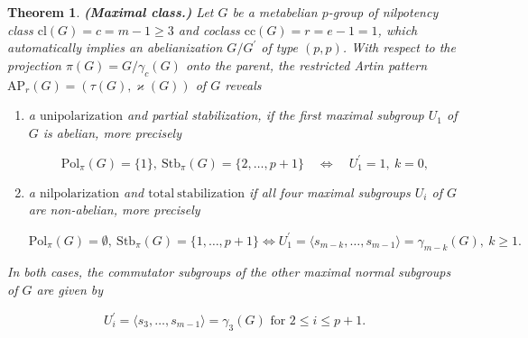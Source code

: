 \documentclass{amsart}
\newtheorem{theorem}{Theorem}[section]
\theoremstyle{definition}
\numberwithin{equation}{section}
\begin{document}
\begin{theorem}
\label{thm:MaxClass}
\textbf{(Maximal class.)}
Let \(G\) be a metabelian \(p\)-group
of nilpotency class \(\mathrm{cl}(G)=c=m-1\ge 3\) and coclass \(\mathrm{cc}(G)=r=e-1=1\),
which automatically implies an abelianization \(G/G^\prime\) of type \((p,p)\).
With respect to the projection \(\pi(G)=G/\gamma_c(G)\) onto the parent,
the restricted Artin pattern \(\mathrm{AP}_r(G)=(\tau(G),\varkappa(G))\) of \(G\) reveals

\begin{enumerate}

\item
a \(\mathrm{unipolarization}\) and partial stabilization,
if the first maximal subgroup \(U_1\) of \(G\) is abelian,
more precisely

\begin{equation}
\label{eqn:UniPolMax}
\mathrm{Pol}_{\pi}(G)=\lbrace 1\rbrace,\ \mathrm{Stb}_{\pi}(G)=\lbrace 2,\ldots,p+1\rbrace
\quad\Longleftrightarrow\quad
U_1^\prime=1,\ k=0,
\end{equation}

\item
a \(\mathrm{nilpolarization}\) and \(\mathrm{total\ stabilization}\)
if all four maximal subgroups \(U_i\) of \(G\) are non-abelian,
more precisely

\begin{equation}
\label{eqn:NilPolMax}
\mathrm{Pol}_{\pi}(G)=\emptyset,\ \mathrm{Stb}_{\pi}(G)=\lbrace 1,\ldots,p+1\rbrace
\Longleftrightarrow
U_1^\prime=\langle s_{m-k},\ldots,s_{m-1}\rangle=\gamma_{m-k}(G),\ k\ge 1.
\end{equation}

\end{enumerate}

\noindent
In both cases,
the commutator subgroups of the other maximal normal subgroups of \(G\) are given by

\begin{equation}
\label{eqn:}
U_i^\prime=\langle s_3,\ldots,s_{m-1}\rangle=\gamma_{3}(G) \text{ for } 2\le i\le p+1.
\end{equation}

\end{theorem}
\end{document}
